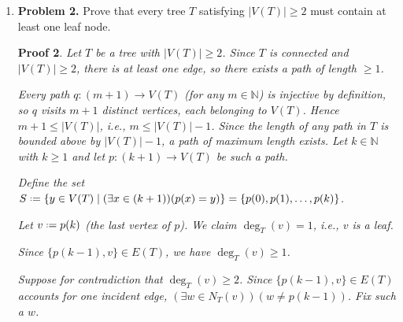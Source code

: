 \documentclass[12pt]{article}
\newcommand{\defeq}{\mathrel{\vcenter{\baselineskip0.5ex \lineskiplimit0pt
                     \hbox{\scriptsize.}\hbox{\scriptsize.}}}=}
\newcommand{\N}{\mathbb{N}}
\theoremstyle{proofstyle}
\newtheorem*{proof*}{Proof}
\begin{document}
\begin{enumerate}[left=0pt, itemsep=2em, parsep=1em]
\begin{proof*}
Define $c : ((j_1 - i) + (j_2 - i) + 1) \to V(T)$ by following $p_1$ forward from $u$ to $u'$,
then $p_2$ backward from $u'$ to $u$:
\[
  c(m) \defeq \begin{cases}
    p_1(i + m) & \text{if } 0 \leq m \leq j_1 - i, \\
    p_2(j_2 - (m - (j_1 - i))) & \text{if } j_1 - i < m \leq (j_1 - i) + (j_2 - i).
  \end{cases}
\]
Then $c(0) = p_1(i) = u$ and $c((j_1 - i) + (j_2 - i)) = p_2(i) = u$, so $c$ is a circuit.
By the minimality of $i$, $j_1$, and $j_2$, no internal vertex repeats, so $c$ is a cycle.
But $T$ is a tree, so $T$ contains no cycles --- a contradiction.

Therefore the path from $v$ to $w$ is unique. \qed

\end{proof*}

\newpage

\item[]
\begin{questionbox}
\textbf{Problem 2.} Prove that every tree $T$ satisfying $|V(T)| \geq 2$ must contain at least one leaf node.
\end{questionbox}

\begin{proof*}

Let $T$ be a tree with $|V(T)| \geq 2$. Since $T$ is connected and $|V(T)| \geq 2$,
there is at least one edge, so there exists a path of length $\geq 1$.

Every path $q : (m+1) \to V(T)$ (for any $m \in \N$) is injective by definition, so $q$
visits $m+1$ distinct vertices, each belonging to $V(T)$. Hence $m + 1 \leq |V(T)|$,
i.e., $m \leq |V(T)| - 1$. Since the length of any path in $T$ is bounded above by
$|V(T)| - 1$, a path of maximum length exists. Let $k \in \N$ with $k \geq 1$ and let
$p : (k+1) \to V(T)$ be such a path.

Define the set
$S \defeq \{y \in V(T) \mid (\exists x \in (k+1))(p(x) = y)\} = \{p(0), p(1), \ldots, p(k)\}$.

Let $v \defeq p(k)$ (the last vertex of $p$). We claim $\deg_T(v) = 1$, i.e., $v$ is a leaf.

Since $\{p(k-1), v\} \in E(T)$, we have $\deg_T(v) \geq 1$.

Suppose for contradiction that $\deg_T(v) \geq 2$. Since $\{p(k-1), v\} \in E(T)$
accounts for one incident edge, $(\exists w \in N_T(v))(w \neq p(k-1))$. Fix such a $w$.


\end{proof*}
\end{enumerate}
\end{document}
